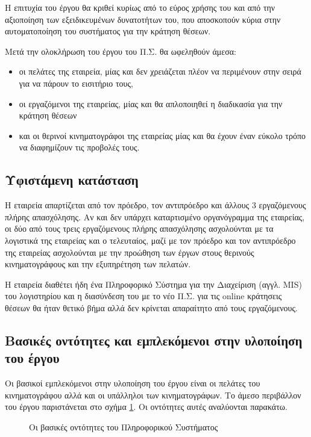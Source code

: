 \documentclass{assignment}
\begin{document}
Η επιτυχία του έργου θα κριθεί κυρίως από το εύρος χρήσης του και από την αξιοποίηση των εξειδικευμένων δυνατοτήτων του, που αποσκοπούν κύρια στην αυτοματοποίηση του συστήματος για την κράτηση θέσεων.

Μετά την ολοκλήρωση του έργου του Π.Σ. θα ωφεληθούν άμεσα:

\begin{itemize}
\item οι πελάτες της εταιρεία, μίας και δεν χρειάζεται πλέον να περιμένουν στην σειρά για να πάρουν το εισιτήριο τους, 
\item οι εργαζόμενοι της εταιρείας, μίας και θα απλοποιηθεί η διαδικασία για την κράτηση θέσεων
\item και οι θερινοί κινηματογράφοι της εταιρείας μίας και θα έχουν έναν εύκολο τρόπο να διαφημίζουν τις προβολές τους.
\end{itemize}

\subsection{Υφιστάμενη κατάσταση}

Η εταιρεία απαρτίζεται από τον πρόεδρο, τον αντιπρόεδρο και άλλους 3 εργαζόμενους πλήρης απασχόλησης. Αν και δεν υπάρχει καταρτισμένο οργανόγραμμα της εταιρείας, οι δύο από τους τρεις εργαζόμενους πλήρης απασχόλησης ασχολούνται με τα λογιστικά της εταιρείας και ο τελευταίος, μαζί με τον πρόεδρο και τον αντιπρόεδρο της εταιρείας ασχολούνται με την προώθηση των έργων στους θερινούς κινηματογράφους και την εξυπηρέτηση των πελατών.

Η εταιρεία διαθέτει ήδη ένα Πληροφορικό Σύστημα για την Διαχείριση (αγγλ. MIS) του λογιστηρίου και η διασύνδεση του με το νέο Π.Σ. για τις online κράτησεις θέσεων θα ήταν θετικό βήμα αλλά δεν κρίνεται απαραίτητο από τους εργαζόμενους.

\subsection{Βασικές οντότητες και εμπλεκόμενοι στην υλοποίηση του έργου}

Οι βασικοί εμπλεκόμενοι στην υλοποίηση του έργου είναι οι πελάτες του κινηματογράφου αλλά και οι υπάλληλοι των κινηματογράφων. Το άμεσο περιβάλλον του έργου παριστάνεται στο σχήμα \ref{fig:entities}. Οι οντότητες αυτές αναλύονται παρακάτω. 

\begin{figure}
\begin{center}
\caption{Οι βασικές οντότητες του Πληροφορικού Συστήματος}
\label{fig:entities}
\end{center}
\end{figure}
\end{document}
